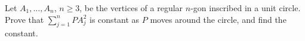 Let $A_1,\ldots,A_n$, $n\ge3$, be the vertices of a regular $n$-gon inscribed in a unit circle. Prove that $\sum_{j=1}^n PA_j^2$ is constant as $P$ moves around the circle, and find the constant.
